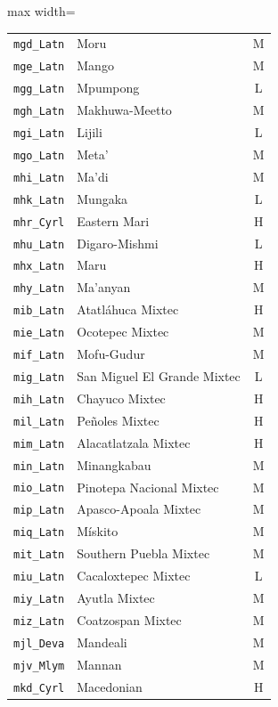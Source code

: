 {\begin{adjustbox}{max width=\textwidth}
\begin{tabular}{llc}
        \texttt{mgd\_Latn} & Moru & M \\
        \texttt{mge\_Latn} & Mango & M \\
        \texttt{mgg\_Latn} & Mpumpong & L \\
        \texttt{mgh\_Latn} & Makhuwa-Meetto & M \\
        \texttt{mgi\_Latn} & Lijili & L \\
        \texttt{mgo\_Latn} & Meta' & M \\
        \texttt{mhi\_Latn} & Ma'di & M \\
        \texttt{mhk\_Latn} & Mungaka & L \\
        \texttt{mhr\_Cyrl} & Eastern Mari & H \\
        \texttt{mhu\_Latn} & Digaro-Mishmi & L \\
        \texttt{mhx\_Latn} & Maru & H \\
        \texttt{mhy\_Latn} & Ma'anyan & M \\
        \texttt{mib\_Latn} & Atatláhuca Mixtec & H \\
        \texttt{mie\_Latn} & Ocotepec Mixtec & M \\
        \texttt{mif\_Latn} & Mofu-Gudur & M \\
        \texttt{mig\_Latn} & San Miguel El Grande Mixtec & L \\
        \texttt{mih\_Latn} & Chayuco Mixtec & H \\
        \texttt{mil\_Latn} & Peñoles Mixtec & H \\
        \texttt{mim\_Latn} & Alacatlatzala Mixtec & H \\
        \texttt{min\_Latn} & Minangkabau & M \\
        \texttt{mio\_Latn} & Pinotepa Nacional Mixtec & M \\
        \texttt{mip\_Latn} & Apasco-Apoala Mixtec & M \\
        \texttt{miq\_Latn} & Mískito & M \\
        \texttt{mit\_Latn} & Southern Puebla Mixtec & M \\
        \texttt{miu\_Latn} & Cacaloxtepec Mixtec & L \\
        \texttt{miy\_Latn} & Ayutla Mixtec & M \\
        \texttt{miz\_Latn} & Coatzospan Mixtec & M \\
        \texttt{mjl\_Deva} & Mandeali & M \\
        \texttt{mjv\_Mlym} & Mannan & M \\
        \texttt{mkd\_Cyrl} & Macedonian & H \\

\end{tabular}
\end{adjustbox}}

